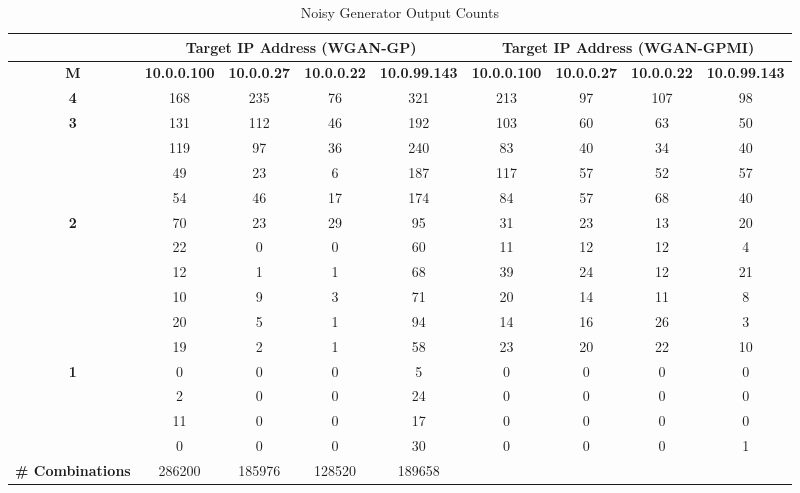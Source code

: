 \begin{table}[!htbp]
	\centering
	\caption{Noisy Generator Output Counts}
	\label{tab:random_outputs}
	\begin{adjustbox}{angle=90}
		\begin{tabular}{c|c|c|c|c|c|c|c|c}
			\multicolumn{1}{c|}{} & \multicolumn{4}{c|}{\textbf{Target IP Address (WGAN-GP)}} & \multicolumn{4}{c}{\textbf{Target IP Address (WGAN-GPMI)}} \\ \hline

			\textbf{M} & \multicolumn{1}{l|}{\textbf{10.0.0.100}} & \multicolumn{1}{l|}{\textbf{10.0.0.27}} & \multicolumn{1}{l|}{\textbf{10.0.0.22}} & \multicolumn{1}{l|}{\textbf{10.0.99.143}} & \multicolumn{1}{l|}{\textbf{10.0.0.100}} & \multicolumn{1}{l|}{\textbf{10.0.0.27}} & \multicolumn{1}{l|}{\textbf{10.0.0.22}} & \multicolumn{1}{l}{\textbf{10.0.99.143}} \\
			\hline
			\textbf{4} & 168 & 235 & 76 & 321 & 213 & 97 & 107 & 98 \\
			\hline
			\multirow{4}{*}{\textbf{3}} & 131 & 112 & 46 & 192 & 103 & 60 & 63 & 50 \\
			& 119 & 97 & 36  & 240 & 83 & 40 & 34 & 40 \\
			& 49  & 23 & 6  & 187  & 117 & 57  & 52 & 57 \\
			& 54  & 46 & 17 & 174  & 84  & 57  & 68 & 40 \\
			\hline
			\multirow{6}{*}{\textbf{2}} & 70 & 23 & 29 & 95 & 31 & 23 & 13 & 20 \\
			& 22  & 0 & 0  & 60 & 11 & 12 & 12 & 4  \\
			& 12  & 1 & 1  & 68 & 39 & 24 & 12 & 21 \\
			& 10  & 9 & 3  & 71 & 20 & 14 & 11 & 8  \\
			& 20  & 5 & 1  & 94 & 14 & 16 & 26 & 3  \\
			& 19  & 2 & 1  & 58 & 23 & 20 & 22 & 10 \\
			\hline
			\multirow{4}{*}{\textbf{1}} & 0  & 0  & 0  & 5  & 0  & 0  & 0  & 0  \\
			& 2   & 0 & 0  & 24 & 0  & 0  & 0  & 0  \\
			& 11  & 0 & 0  & 17 & 0  & 0  & 0  & 0  \\
			& 0   & 0 & 0  & 30 & 0  & 0  & 0  & 1  \\
			\hline
			\multicolumn{1}{l|}{\textbf{\# Combinations}} & 286200 & 185976 & 128520 & 189658 & \multicolumn{1}{l|}{} & \multicolumn{1}{l|}{} & \multicolumn{1}{l|}{} & \multicolumn{1}{l}{}
		\end{tabular}
	\end{adjustbox}
\end{table}

